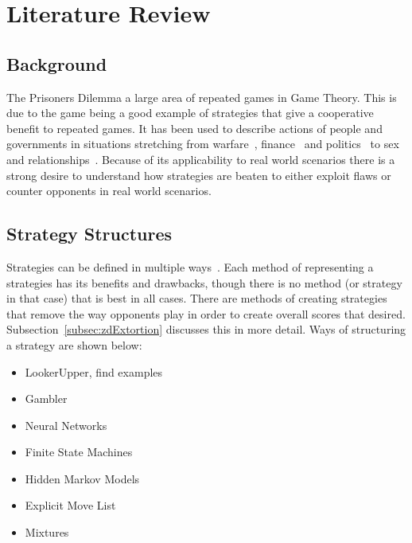 
\chapter{Literature Review}\label{ch:literature}
\section{Background}\label{sec:background}
The Prisoners Dilemma a large area of repeated games in Game Theory.
This is due to the game being a good example of strategies that give a cooperative benefit to repeated games.
It has been used to describe actions of people and governments in situations stretching from warfare~\cite{tooby1988war,aumann1992handbook}, finance~\cite{cable1997finance} and politics~\cite{snidal1985Politics} to sex and relationships~\cite{low2015sex}.
Because of its applicability to real world scenarios there is a strong desire to understand how strategies are beaten to either exploit flaws or counter opponents in real world scenarios.

\section{Strategy Structures}\label{sec:stratergyStructures}
Strategies can be defined in multiple ways~\cite{harper2017reinforcement}.
Each method of representing a strategies has its benefits and drawbacks, though there is no method (or strategy in that case) that is best in all cases.
There are methods of creating strategies that remove the way opponents play in order to create overall scores that desired.
Subsection~\ref{subsec:zdExtortion} discusses this in more detail.
Ways of structuring a strategy are shown below:

\begin{itemize}
 \item LookerUpper, find examples
 \item Gambler
 \item Neural Networks
 \item Finite State Machines
 \item Hidden Markov Models
 \item Explicit Move List
 \item Mixtures
\end{itemize}


